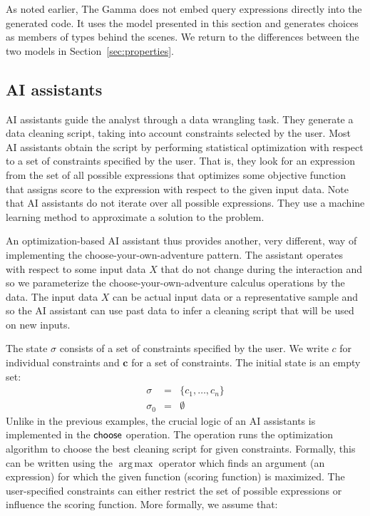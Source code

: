 \documentclass[anonymous, a4paper,UKenglish,cleveref, autoref, thm-restate]{lipics-v2021}
\newcommand{\ident}[1]{\textsf{#1}}
\newcommand{\sigmaN}{\sigma_0}
\newcommand{\select}{\textnormal{\ident{choose}}}
\DeclareMathOperator{\argmax}{arg\,max}
\begin{document}
As noted earlier, The Gamma does not embed query expressions directly into the generated code.
It uses the model presented in this section and generates choices as members of
types behind the scenes. We return to the differences between the two models in
Section~\ref{sec:properties}.


\subsection{AI assistants}
\label{sec:examples-aias}

AI assistants guide the analyst through a data wrangling task. They
generate a data cleaning script, taking into account constraints selected by the user.
Most AI assistants obtain the script by performing statistical optimization with respect
to a set of constraints specified by the user. That is, they look for an expression from the
set of all possible expressions that optimizes some objective function that assigns score to
the expression with respect to the given input data. Note that AI assistants do not iterate
over all possible expressions. They use a machine learning method to approximate a solution
to the problem.

An optimization-based AI assistant \cite{petricek-2023-aias} thus provides another, very
different, way of implementing the choose-your-own-adventure pattern. The assistant operates
with respect to some input data $X$ that do not change during the interaction and so we
parameterize the choose-your-own-adventure calculus operations by the data.
The input data $X$ can be actual input data or a representative sample and so the AI assistant
can use past data to infer a cleaning script that will be used on new inputs.

The state $\sigma$ consists of a set of constraints specified by the user. We write
$c$ for individual constraints and $\boldsymbol{c}$ for a set of constraints. The initial
state is an empty set:
\[
\begin{array}{rcl}
\sigma &=& \{ c_1, \ldots, c_n \}\\
\sigmaN &=& \emptyset
\end{array}
\]
Unlike in the previous examples, the crucial logic of an AI assistants is implemented in the
$\select$ operation. The operation runs the optimization algorithm to choose the best cleaning
script for given constraints. Formally, this can be written using the $\argmax$ operator which
finds an argument (an expression) for which the given function (scoring function) is maximized.
The user-specified constraints can either restrict the set of possible expressions or influence
the scoring function. More formally, we assume that:
\end{document}
